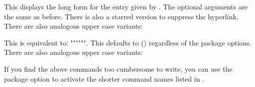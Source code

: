 \documentclass{nlctdoc}
\begin{document}
\begin{definition}[\DescribeMacro{\acrlong}]
\end{definition}
This displays the long form for the entry given by .
The optional arguments are the same as before.  There is also a starred 
version to suppress the hyperlink. There are also analogous upper case 
variants:
\begin{definition}[\DescribeMacro{\Acrlong}]
\end{definition}
\begin{definition}[\DescribeMacro{\ACRshort}]
\end{definition}

\begin{definition}[\DescribeMacro{\acrfull}]
\end{definition}
This is equivalent to: 
\DescribeMacro{\acrfullformat}"{""}{""}".
This defaults to  ()
regardless of the package options. There are also analogous upper
case variants:
\begin{definition}[\DescribeMacro{\Acrfull}]
\end{definition}
\begin{definition}[\DescribeMacro{\ACRfull}]
\end{definition}

If you find the above commands too cumbersome to write, you can use
the  package option to activate the shorter
command names listed in .
\end{document}
